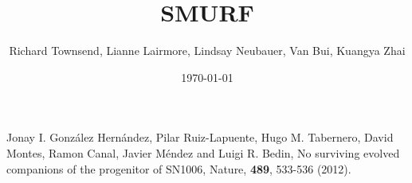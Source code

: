 \documentclass[dvips, 12pt]{article}
\begin{document}

\title{SMURF}
\author{Richard Townsend, Lianne Lairmore, Lindsay Neubauer, Van Bui, Kuangya Zhai}
\date{\today}



\maketitle







 
\begin{thebibliography}{99}

 Jonay I. Gonz\'{a}lez Hern\'{a}ndez, 
Pilar Ruiz-Lapuente,	
Hugo M. Tabernero,	
David Montes,	
Ramon Canal,	
Javier M\'{e}ndez	
and Luigi R. Bedin,
{No surviving evolved companions of the progenitor of SN1006},
Nature, {\bf 489}, 533-536 (2012).

\end{thebibliography}
\end{document}
